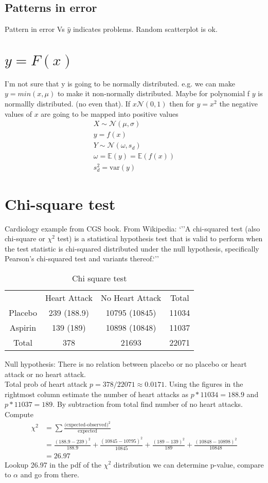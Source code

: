 \documentclass{article}
\newcommand{\ber}{\begin{eqnarray}}
\newcommand{\eer}{\end{eqnarray}}
\newcommand{\ra}[1]{\renewcommand{\arraystretch}{#1}}
\begin{document}
\subsection{Patterns in error}
Pattern in error Vs $\hat{y}$ indicates problems. Random scatterplot is ok.
\section{$y=F(x)$}
I'm not sure that y is going to be normally distributed. e.g. we can make $y=min(x,\mu)$ to make it non-normally distributed. Maybe for polynomial f $y$ is normallly distributed. (no even that). If $x\mathcal{N}(0,1)$ then for $y=x^2$ the negative values of $x$ are going to be mapped into positive values\\
\ber
X \sim \mathcal{N}(\mu,\sigma)\\
y = f(x) \\
Y \sim \mathcal{N}(\omega,s_d)\\
\omega = \mathbb{E}(y) = \mathbb{E}(f(x))\\
s_d^2 = \text{var}(y)
\eer
\section{Chi-square test}
Cardiology example from CGS book. From Wikipedia: `''A chi-squared test (also chi-square or $\chi^2$ test) is a statistical hypothesis test that is valid to perform when the test statistic is chi-squared distributed under the null hypothesis, specifically Pearson's chi-squared test and variants thereof.`''
\begin{table}\centering
  \ra{1.3}
  \begin{tabular}{cccc}
    \toprule
            & Heart Attack & No Heart Attack & Total\\
    Placebo &      239 (188.9) &  10795  (10845)    & 11034 \\ 
    Aspirin &      139 (189)   &  10898  (10848)    & 11037\\
    Total   &    378       &  21693          & 22071 \\     
    \midrule
  \end{tabular}
  \caption{\label{tab:chi2} Chi square test}
\end{table}    
Null hypothesis: There is no relation between placebo  or no placebo or heart attack or no heart attack.\\
Total prob of heart attack $p=378/22071\approx{0.0171}$. Using the figures in the rightmost column estimate the number of heart attacks as $p*11034=188.9$ and $p*11037=189$. By subtraction from total find number of no heart attacks. Compute
\begin{align}
  \chi^2 &= \sum \frac{\text{(expected-observed})^2}{\text{expected}} \\
  &= \frac{(188.9-239)^2}{188.9} + \frac{(10845-10795)^2}{10845} + \frac{(189-139)^2}{189} + \frac{(10848-10898)^2}{10848}\\
  &= 26.97
\end{align}
Lookup 26.97 in the pdf of the $\chi^2$ distribution we can determine p-value, compare to $\alpha$ and go from there.
\end{document}

